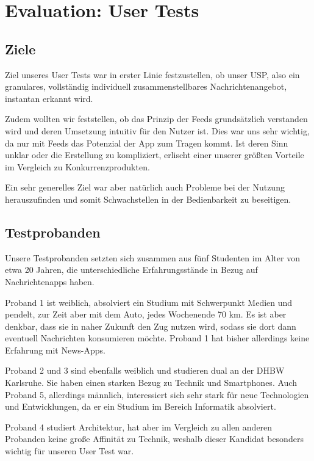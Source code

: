 
\section{Evaluation: User Tests}

\subsection{Ziele}

Ziel unseres User Tests war in erster Linie festzustellen, ob unser USP, also ein granulares, vollständig individuell zusammenstellbares Nachrichtenangebot, instantan erkannt wird.

Zudem wollten wir feststellen, ob das Prinzip der Feeds grundsätzlich verstanden wird und deren Umsetzung intuitiv für den Nutzer ist. Dies war uns sehr wichtig, da nur mit Feeds das Potenzial der App zum Tragen kommt. Ist deren Sinn unklar oder die Erstellung zu kompliziert, erlischt einer unserer größten Vorteile im Vergleich zu Konkurrenzprodukten.

Ein sehr generelles Ziel war aber natürlich auch Probleme bei der Nutzung herauszufinden und somit Schwachstellen in der Bedienbarkeit zu beseitigen.

\subsection{Testprobanden}

Unsere Testprobanden setzten sich zusammen aus fünf Studenten im Alter von etwa 20 Jahren, die unterschiedliche Erfahrungsstände in Bezug auf Nachrichtenapps haben.

Proband 1 ist weiblich, absolviert ein Studium mit Schwerpunkt Medien und pendelt, zur Zeit aber mit dem Auto, jedes Wochenende 70 km. Es ist aber denkbar, dass sie in naher Zukunft den Zug nutzen wird, sodass sie dort dann eventuell Nachrichten konsumieren möchte. Proband 1 hat bisher allerdings keine Erfahrung mit News-Apps.

Proband 2 und 3 sind ebenfalls weiblich und studieren dual an der DHBW Karlsruhe. Sie haben einen starken Bezug zu Technik und Smartphones. Auch Proband 5, allerdings männlich, interessiert sich sehr stark für neue Technologien und Entwicklungen, da er ein Studium im Bereich Informatik absolviert.

Proband 4 studiert Architektur, hat aber im Vergleich zu allen anderen Probanden keine große Affinität zu Technik, weshalb dieser Kandidat besonders wichtig für unseren User Test war.


